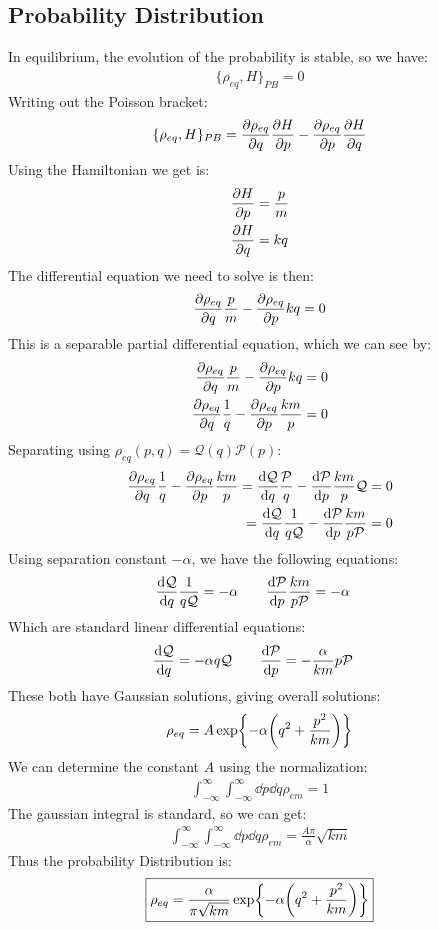 \documentclass[12pt]{article}
\newcommand{\PB}[2]{\{#1,#2\}_{PB}}
\begin{document}
\subsection{Probability Distribution}
In equilibrium, the evolution of the probability is stable, so we have:
\begin{align*}
  \PB{\rho_{eq}}{H}=0
\end{align*}
Writing out the Poisson bracket:
\begin{align*}
  \PB{\rho_{eq}}{H}=\pdv{\rho_{eq}}{q}\pdv{H}{p}-\pdv{\rho_{eq}}{p}\pdv{H}{q}
\end{align*}
Using the Hamiltonian we get is:
\begin{align*}
  \pdv{H}{p}&=\frac{p}{m}\\
  \pdv{H}{q}&=kq
\end{align*}
The differential equation we need to solve is then:
\begin{align*}
  \pdv{\rho_{eq}}{q}\frac{p}{m}-\pdv{\rho_{eq}}{p}kq=0
\end{align*}
This is a separable partial differential equation, which we can see by:
\begin{align*}
  \pdv{\rho_{eq}}{q}\frac{p}{m}-\pdv{\rho_{eq}}{p}kq&=0\\
  \pdv{\rho_{eq}}{q}\frac{1}{q}-\pdv{\rho_{eq}}{p}\frac{km}{p}&=0
\end{align*}
Separating using $\rho_{eq}(p,q)=\mathcal{Q}(q)\mathcal{P}(p)$:
\begin{align*}
  \pdv{\rho_{eq}}{q}\frac{1}{q}-\pdv{\rho_{eq}}{p}\frac{km}{p}=
  \dv{\mathcal{Q}}{q}\frac{\mathcal{P}}{q}
  -\dv{\mathcal{P}}{p}\frac{km}{p}\mathcal{Q}&=0\\
  =\dv{\mathcal{Q}}{q}\frac{1}{q\mathcal{Q}}
  -\dv{\mathcal{P}}{p}\frac{km}{p\mathcal{P}}&=0
\end{align*}
Using separation constant $-\alpha$, we have the following equations:
\begin{align*}
  \dv{\mathcal{Q}}{q}\frac{1}{q\mathcal{Q}}&=-\alpha\qquad
  \dv{\mathcal{P}}{p}\frac{km}{p\mathcal{P}}=-\alpha
\end{align*}
Which are standard linear differential equations:
\begin{align*}
  \dv{\mathcal{Q}}{q}&=-\alpha q\mathcal{Q}\qquad
  \dv{\mathcal{P}}{p}=-\frac\alpha{km}p\mathcal{P}
\end{align*}
These both have Gaussian solutions, giving overall solutions:
\begin{align*}
  \rho_{eq}=A\exp{-\alpha\qty(q^2+\frac{p^2}{km})}
\end{align*}
We can determine the constant $A$ using the normalization:
\begin{align*}
  \int_{-\infty}^\infty\int_{-\infty}^\infty\dd{p}\dd{q}\rho_{em}=1
\end{align*}
The gaussian integral is standard, so we can get:
\begin{align*}
  \int_{-\infty}^\infty\int_{-\infty}^\infty\dd{p}\dd{q}\rho_{em}=
  \frac{A\pi}{\alpha}\sqrt{km}
\end{align*}
Thus the probability Distribution is:
\begin{align}
  \boxed{
    \rho_{eq}=\frac{\alpha}{\pi\sqrt{km}}\exp{-\alpha\qty(q^2+\frac{p^2}{km})}
  }
\end{align}
\end{document}
